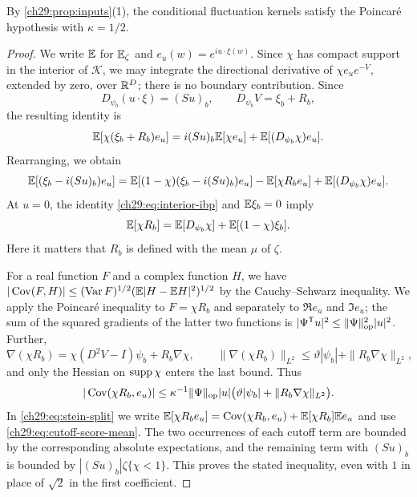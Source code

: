 By \cref{ch29:prop:inputs}(1), the conditional fluctuation kernels satisfy the Poincaré hypothesis with $\kappa=1/2$.

\begin{proof}
We write $\mathbb E$ for $\mathbb E_\zeta$ and $e_u(w)=e^{iu\cdot\xi(w)}$. Since $\chi$ has compact support in the interior of $\mathcal K$, we may integrate the directional derivative of $\chi e_ue^{-V}$, extended by zero, over $\mathbb R^D$; there is no boundary contribution. Since
\[
 D_{\psi_b}(u\cdot\xi)=(Su)_b,\qquad D_{\psi_b}V=\xi_b+R_b,
\]
the resulting identity is
\begin{equation}\label{ch29:eq:interior-ibp}
 \mathbb E[\chi(\xi_b+R_b)e_u]=i(Su)_b\mathbb E[\chi e_u]+\mathbb E[(D_{\psi_b}\chi)e_u].
\end{equation}
Rearranging, we obtain
\begin{equation}\label{ch29:eq:stein-split}
 \mathbb E[(\xi_b-i(Su)_b)e_u]=\mathbb E[(1-\chi)(\xi_b-i(Su)_b)e_u]-\mathbb E[\chi R_be_u]+\mathbb E[(D_{\psi_b}\chi)e_u].
\end{equation}
At $u=0$, the identity \eqref{ch29:eq:interior-ibp} and $\mathbb E\xi_b=0$ imply
\begin{equation}\label{ch29:eq:cutoff-score-mean}
 \mathbb E[\chi R_b]=\mathbb E[D_{\psi_b}\chi]+\mathbb E[(1-\chi)\xi_b].
\end{equation}
Here it matters that $R_b$ is defined with the mean $\mu$ of $\zeta$.

For a real function $F$ and a complex function $H$, we have $|\operatorname{Cov}(F,H)|\le(\operatorname{Var} F)^{1/2}(\mathbb E|H-\mathbb E H|^2)^{1/2}$ by the Cauchy--Schwarz inequality. We apply the Poincaré inequality to $F=\chi R_b$ and separately to $\Re e_u$ and $\Im e_u$; the sum of the squared gradients of the latter two functions is $|\Psi^{\mathsf T}u|^2\le\|\Psi\|_{\rm op}^2|u|^2$. Further,
\[
 \nabla(\chi R_b)=\chi(D^2V-I)\psi_b+R_b\nabla\chi,\qquad \|\nabla(\chi R_b)\|_{L^2}\le\vartheta|\psi_b|+\|R_b\nabla\chi\|_{L^2},
\]
and only the Hessian on $\operatorname{supp}\chi$ enters the last bound. Thus
\[
 |\operatorname{Cov}(\chi R_b,e_u)|\le\kappa^{-1}\|\Psi\|_{\rm op}|u|\bigl(\vartheta|\psi_b|+\|R_b\nabla\chi\|_{L^2}\bigr).
\]
In \eqref{ch29:eq:stein-split} we write $\mathbb E[\chi R_be_u]=\operatorname{Cov}(\chi R_b,e_u)+\mathbb E[\chi R_b]\mathbb E e_u$ and use \eqref{ch29:eq:cutoff-score-mean}. The two occurrences of each cutoff term are bounded by the corresponding absolute expectations, and the remaining term with $(Su)_b$ is bounded by $|(Su)_b|\zeta\{\chi<1\}$. This proves the stated inequality, even with $1$ in place of $\sqrt2$ in the first coefficient.
\end{proof}

